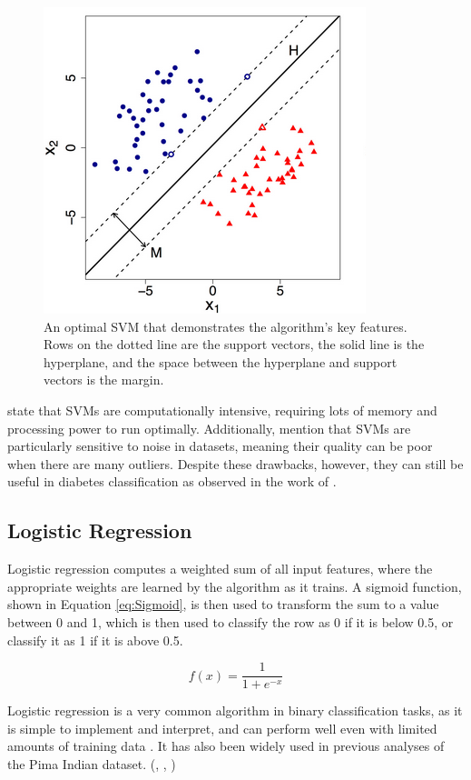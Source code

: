 \documentclass[12pt]{report}
\newcommand{\para}{\vspace{8pt}\noindent}
\begin{document}
\begin{figure}[H]
    \centering
    \includegraphics[width=.5\linewidth]{Algorithms/OptimalSVM.png}
    \caption{An optimal SVM that demonstrates the algorithm's key features. Rows on the dotted line are the support vectors, the solid line is the hyperplane, and the space
    between the hyperplane and support vectors is the margin. \autocite{kirchner_using_2018}}
    \label{fig:OptimalSVM}
\end{figure}

\para \textcite{kirchner_using_2018} state that SVMs are computationally intensive, requiring lots of memory and processing power 
to run optimally. Additionally, \textcite{atla_sensitivity_2011} mention that SVMs are particularly sensitive to noise in 
datasets, meaning their quality can be poor when there are many outliers. Despite these drawbacks, however, they can still 
be useful in diabetes classification as observed in the work of \textcite{zou_construction_2024}.

\subsection{Logistic Regression}
Logistic regression computes a weighted sum of all input features, where the appropriate weights are learned by the algorithm as it trains.
A sigmoid function, shown in Equation \ref{eq:Sigmoid}, is then used to transform the sum to a value between 0 and 1, which is then used to classify the row as 0 if it is below 
0.5, or classify it as 1 if it is above 0.5. 

\begin{equation}\label{eq:Sigmoid}
    f(x) = \frac{1}{1 + e^{-x}}     
\end{equation}

\para Logistic regression is a very common algorithm in binary classification tasks, as it is simple to implement and interpret, and
can perform well even with limited amounts of training data \autocite{kavya_applications_2024}. It has also been widely used in previous 
analyses of the Pima Indian dataset. (\textcite{alzubi_diabetes_2023}, \textcite{joshi_predicting_2021}, \textcite{zou_construction_2024})
\end{document}
